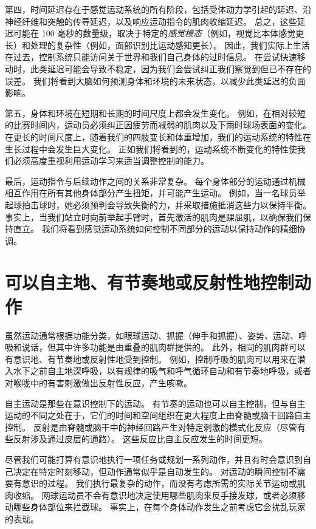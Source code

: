 第四，时间延迟存在于感觉运动系统的所有阶段，包括受体动力学引起的延迟、沿神经纤维和突触的传导延迟，以及响应运动指令的肌肉收缩延迟。
总之，这些延迟可能在 100 毫秒的数量级，取决于特定的\textit{感觉模态}（例如，视觉比本体感觉更长）和处理的复杂性（例如，面部识别比运动感知更长）。
因此，我们实际上生活在过去，控制系统只能访问关于世界和我们自己身体的过时信息。
在尝试快速移动时，此类延迟可能会导致不稳定，因为我们会尝试纠正我们察觉到但已不存在的误差。
我们将看到大脑如何预测身体和环境的未来状态，以减少此类延迟的负面影响。


第五，身体和环境在短期和长期的时间尺度上都会发生变化。
例如，在相对较短的比赛时间内，运动员必须纠正因疲劳而减弱的肌肉以及下雨时球场表面的变化。
在更长的时间尺度上，随着我们的四肢变长和体重增加，我们的运动系统的特性在生长过程中会发生巨大变化。
正如我们将看到的，运动系统不断变化的特性使我们必须高度重视利用运动学习来适当调整控制的能力。


最后，运动指令与后续动作之间的关系非常复杂。
每个身体部分的运动通过机械相互作用在所有其他身体部分产生扭矩，并可能产生运动。
例如，当一名球员举起球拍击球时，她必须预判会导致失衡的力，并采取措施抵消这些力以保持平衡。
事实上，当我们站立时向前举起手臂时，首先激活的肌肉是踝屈肌，以确保我们保持直立。
我们将看到感觉运动系统如何控制不同部分的运动以保持动作的精细协调。



\section{可以自主地、有节奏地或反射性地控制动作}

虽然运动通常根据功能分类，如眼球运动、抓握（伸手和抓握）、姿势、运动、呼吸和说话，但其中许多功能是由重叠的肌肉群提供的。
此外，相同的肌肉群可以有意识地、有节奏地或反射性地受到控制。
例如，控制呼吸的肌肉可以用来在潜入水下之前自主地深呼吸，以有规律的吸气和呼气循环自动和有节奏地呼吸，或者对喉咙中的有害刺激做出反射性反应，产生咳嗽。


自主运动是那些在意识控制下的运动。
有节奏的运动也可以自主控制，但与自主运动的不同之处在于，它们的时间和空间组织在更大程度上由脊髓或脑干回路自主控制。
反射是由脊髓或脑干中的神经回路产生对特定刺激的模式化反应（尽管有些反射涉及通过皮层的通路）。
这些反应比自主反应发生的时间更短。


尽管我们可能打算有意识地执行一项任务或规划一系列动作，并且有时会意识到自己决定在特定时刻移动，但动作通常似乎是自动发生的。
对运动的瞬间控制不需要有意识的过程。
我们执行最复杂的动作，而没有考虑所需的实际关节运动或肌肉收缩。
网球运动员不会有意识地决定使用哪些肌肉来反手接发球，或者必须移动哪些身体部位来拦截球。
事实上，在每个身体动作发生之前考虑它会扰乱玩家的表现。



